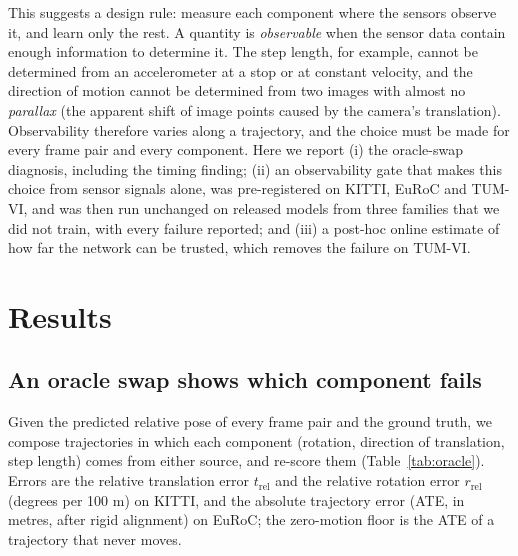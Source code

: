 \documentclass[pdflatex,sn-nature]{sn-jnl}
\begin{document}
This suggests a design rule: measure each component where the sensors observe it, and learn only the rest. A quantity is \emph{observable} when the sensor data contain enough information to determine it. The step length, for example, cannot be determined from an accelerometer at a stop or at constant velocity, and the direction of motion cannot be determined from two images with almost no \emph{parallax} (the apparent shift of image points caused by the camera's translation). Observability therefore varies along a trajectory, and the choice must be made for every frame pair and every component. Here we report (i) the oracle-swap diagnosis, including the timing finding; (ii) an observability gate that makes this choice from sensor signals alone, was pre-registered on KITTI, EuRoC and TUM-VI\cite{Schubert2018}, and was then run unchanged on released models from three families that we did not train, with every failure reported; and (iii) a post-hoc online estimate of how far the network can be trusted, which removes the failure on TUM-VI.

\section{Results}\label{sec:results}

\subsection{An oracle swap shows which component fails}\label{sec:diag}

Given the predicted relative pose of every frame pair and the ground truth, we compose trajectories in which each component (rotation, direction of translation, step length) comes from either source, and re-score them (Table~\ref{tab:oracle}). Errors are the relative translation error $t_\mathrm{rel}$ and the relative rotation error $r_\mathrm{rel}$ (degrees per 100 m) on KITTI, and the absolute trajectory error (ATE, in metres, after rigid alignment) on EuRoC; the zero-motion floor is the ATE of a trajectory that never moves.
\end{document}
